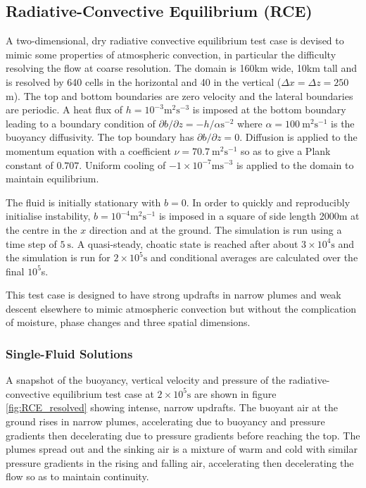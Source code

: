 \documentclass[draft]{agujournal2019}
\begin{document}
\subsection{Radiative-Convective Equilibrium (RCE)}

A two-dimensional, dry radiative convective equilibrium test case
is devised to mimic some properties of atmospheric convection, in
particular the difficulty resolving the flow at coarse resolution.
The domain is 160km wide, 10km tall and is resolved by 640 cells in
the horizontal and 40 in the vertical ($\Delta x=\Delta z=250$m).
The top and bottom boundaries are zero velocity and the lateral boundaries
are periodic. A heat flux of $h=10^{-3}\text{m}^{2}\text{s}^{-3}$
is imposed at the bottom boundary leading to a boundary condition
of $\partial b/\partial z=-h/\alpha\text{s}^{-2}$ where $\alpha=100\ \text{m}^{2}\text{s}^{-1}$
is the buoyancy diffusivity. The top boundary has $\partial b/\partial z=0$.
Diffusion is applied to the momentum equation with a coefficient $\nu=70.7\ \text{m}^{2}\text{s}^{-1}$
so as to give a Plank constant of $0.707$. Uniform cooling of $-1\times10^{-7}\text{m}\text{s}^{-3}$
is applied to the domain to maintain equilibrium.

The fluid is initially stationary with $b=0$. In order to quickly
and reproducibly initialise instability, $b=10^{-4}\text{m}^{2}\text{s}^{-1}$
is imposed in a square of side length 2000m at the centre in the $x$
direction and at the ground. The simulation is run using a time step
of $5\ \text{s}$. A quasi-steady, choatic state is reached after
about $3\times10^{4}\text{s}$ and the simulation is run for $2\times10^{5}\text{s}$
and conditional averages are calculated over the final $10^{5}$s.

This test case is designed to have strong updrafts in narrow plumes
and weak descent elsewhere to mimic atmospheric convection but without
the complication of moisture, phase changes and three spatial dimensions.

\subsubsection{Single-Fluid Solutions}

A snapshot of the buoyancy, vertical velocity and pressure of the
radiative-convective equilibrium test case at $2\times10^{5}\text{s}$
are shown in figure \ref{fig:RCE_resolved} showing intense, narrow
updrafts. The buoyant air at the ground rises in narrow plumes,
accelerating due to buoyancy and pressure gradients then decelerating
due to pressure gradients before reaching the top. The plumes spread
out and the sinking air is a mixture of warm and cold with similar
pressure gradients in the rising and falling air, accelerating then
decelerating the flow so as to maintain continuity. 
\end{document}
